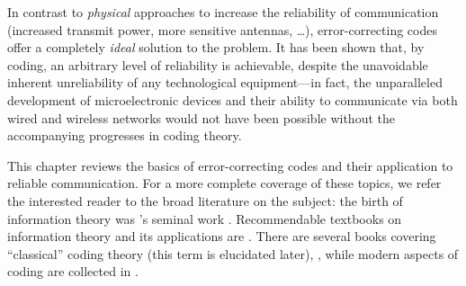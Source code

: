 In contrast to \emph{physical} approaches to increase the reliability of communication (\eg increased transmit power, more sensitive antennas, \dots), error-correcting codes offer a completely \emph{ideal} solution to the problem. It has been shown that, by coding, an arbitrary level of reliability is achievable, despite the unavoidable inherent unreliability of any technological equipment—in fact, the unparalleled development of microelectronic devices and their ability to communicate via both wired and wireless networks would not have been possible without the accompanying progresses in coding theory.

This chapter reviews the basics of error-correcting codes and their application to reliable communication. For a more complete coverage of these topics, we refer the interested reader to the broad literature on the subject: the birth of information theory was \citeauthor{Shannon48}'s seminal work  \cite{Shannon48}. Recommendable textbooks on information theory and its applications are \cite{MacKay03InformationTheory,Gallager68InformationTheory}. There are several books covering \enquote{classical} coding theory (this term is elucidated later), \eg \cite{MacWilliamsSloane77ECC}, while modern aspects of coding are collected in \cite{RichardsonUrbanke08ModernCodingTheory}.

